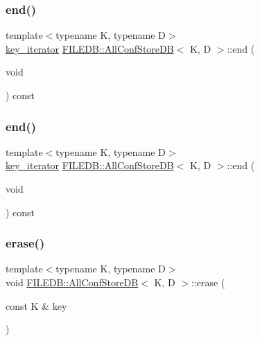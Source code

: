 \subsubsection{\texorpdfstring{end()}{end()}\hspace{0.1cm}{\footnotesize\ttfamily [1/2]}}
{\footnotesize\ttfamily template$<$typename K, typename D$>$ \\
\mbox{\hyperlink{classFILEDB_1_1AllConfStoreDB_a2ce8981ca7049ed0c2c6e438873a9c1b}{key\+\_\+iterator}} \mbox{\hyperlink{classFILEDB_1_1AllConfStoreDB}{F\+I\+L\+E\+D\+B\+::\+All\+Conf\+Store\+DB}}$<$ K, D $>$\+::end (\begin{DoxyParamCaption}\item[{void}]{ }\end{DoxyParamCaption}) const\hspace{0.3cm}{\ttfamily [inline]}}

\mbox{\label{classFILEDB_1_1AllConfStoreDB_a213c914b326e7769411e305ceb375b1d}} 
\subsubsection{\texorpdfstring{end()}{end()}\hspace{0.1cm}{\footnotesize\ttfamily [2/2]}}
{\footnotesize\ttfamily template$<$typename K, typename D$>$ \\
\mbox{\hyperlink{classFILEDB_1_1AllConfStoreDB_a2ce8981ca7049ed0c2c6e438873a9c1b}{key\+\_\+iterator}} \mbox{\hyperlink{classFILEDB_1_1AllConfStoreDB}{F\+I\+L\+E\+D\+B\+::\+All\+Conf\+Store\+DB}}$<$ K, D $>$\+::end (\begin{DoxyParamCaption}\item[{void}]{ }\end{DoxyParamCaption}) const\hspace{0.3cm}{\ttfamily [inline]}}

\mbox{\label{classFILEDB_1_1AllConfStoreDB_afb092d33f9ca14ca30918d6cb8251fdb}} 
\subsubsection{\texorpdfstring{erase()}{erase()}\hspace{0.1cm}{\footnotesize\ttfamily [1/2]}}
{\footnotesize\ttfamily template$<$typename K, typename D$>$ \\
void \mbox{\hyperlink{classFILEDB_1_1AllConfStoreDB}{F\+I\+L\+E\+D\+B\+::\+All\+Conf\+Store\+DB}}$<$ K, D $>$\+::erase (\begin{DoxyParamCaption}\item[{const K \&}]{key }\end{DoxyParamCaption})\hspace{0.3cm}{\ttfamily [inline]}}

